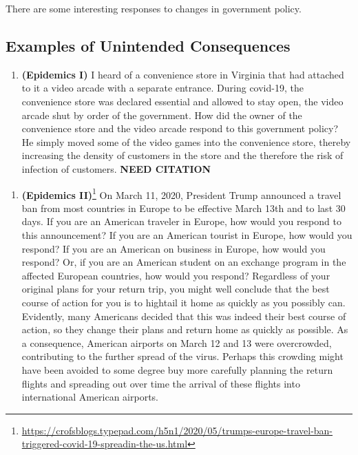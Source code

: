 \documentclass[
]{book}
\providecommand{\tightlist}{%
  \setlength{\itemsep}{0pt}\setlength{\parskip}{0pt}}
\begin{document}
There are some interesting responses to changes in government policy.

\hypertarget{examples-of-unintended-consequences}{%
\subsection{Examples of Unintended Consequences}\label{examples-of-unintended-consequences}}

\begin{enumerate}
\def\labelenumi{\arabic{enumi}.}
\tightlist
\item
  \textbf{(Epidemics I)} I heard of a convenience store in Virginia that had attached to it a video arcade with a separate entrance. During covid-19, the convenience store was declared essential and allowed to stay open, the video arcade shut by order of the government. How did the owner of the convenience store and the video arcade respond to this government policy? He simply moved some of the video games into the convenience store, thereby increasing the density of customers in the store and the therefore the risk of infection of customers. \textbf{NEED CITATION}
\end{enumerate}

\begin{enumerate}
\def\labelenumi{\arabic{enumi}.}
\setcounter{enumi}{1}
\tightlist
\item
  \textbf{(Epidemics II)}\footnote{\url{https://crofsblogs.typepad.com/h5n1/2020/05/trumps-europe-travel-ban-triggered-covid-19-spreadin-the-us.html}} On March 11, 2020, President Trump announced a travel ban from most countries in Europe to be effective March 13th and to last 30 days. If you are an American traveler in Europe, how would you respond to this announcement? If you are an American tourist in Europe, how would you respond? If you are an American on business in Europe, how would you respond? Or, if you are an American student on an exchange program in the affected European countries, how would you respond? Regardless of your original plans for your return trip, you might well conclude that the best course of action for you is to hightail it home as quickly as you possibly can. Evidently, many Americans decided that this was indeed their best course of action, so they change their plans and return home as quickly as possible. As a consequence, American airports on March 12 and 13 were overcrowded, contributing to the further spread of the virus. Perhaps this crowding might have been avoided to some degree buy more carefully planning the return flights and spreading out over time the arrival of these flights into international American airports.
\end{enumerate}
\end{document}
